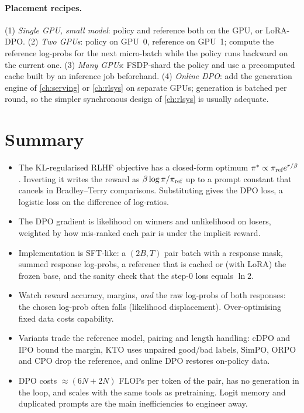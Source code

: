 \paragraph{Placement recipes.} (1) \emph{Single GPU, small model}: policy and reference both on the
GPU, or LoRA-DPO. (2) \emph{Two GPUs}: policy on GPU~0, reference on GPU~1; compute the reference
log-probs for the next micro-batch while the policy runs backward on the current one. (3)
\emph{Many GPUs}: FSDP-shard the policy and use a precomputed cache built by an inference job
beforehand. (4) \emph{Online DPO}: add the generation engine of \cref{ch:serving} or \cref{ch:rlsys}
on separate GPUs; generation is batched per round, so the simpler synchronous design of
\cref{ch:rlsys} is usually adequate.

\section{Summary}\label{sec:dpo:summary}
\begin{itemize}
\item The KL-regularised RLHF objective has a closed-form optimum $\pi^*\propto\pi_{\text{ref}} e^{r/\beta}$.
  Inverting it writes the reward as $\beta\log\pi/\pi_{\text{ref}}$ up to a prompt constant that cancels in
  Bradley--Terry comparisons. Substituting gives the DPO loss, a logistic loss on the difference
  of log-ratios.
\item The DPO gradient is likelihood on winners and unlikelihood on losers, weighted by how
  mis-ranked each pair is under the implicit reward.
\item Implementation is SFT-like: a $(2B,T)$ pair batch with a response mask, summed response
  log-probs, a reference that is cached or (with LoRA) the frozen base, and the sanity check that the
  step-0 loss equals $\ln 2$.
\item Watch reward accuracy, margins, \emph{and} the raw log-probs of both responses: the chosen
  log-prob often falls (likelihood displacement). Over-optimising fixed data costs capability.
\item Variants trade the reference model, pairing and length handling: cDPO and IPO bound the margin,
  KTO uses unpaired good/bad labels, SimPO, ORPO and CPO drop the reference, and online DPO restores
  on-policy data.
\item DPO costs $\approx(6N+2N)$ FLOPs per token of the pair, has no generation in the loop, and
  scales with the same tools as pretraining. Logit memory and duplicated prompts are the main
  inefficiencies to engineer away.
\end{itemize}

